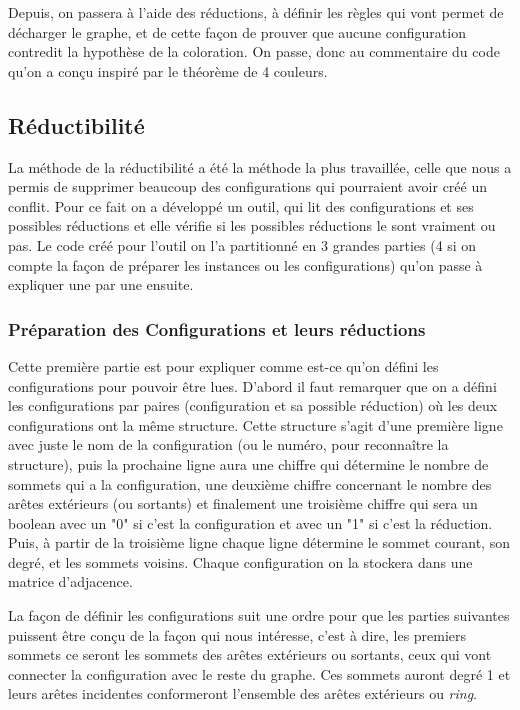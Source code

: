 \documentclass[10pt,a4paper]{article}
\begin{document}
Depuis, on passera à l'aide des réductions, à définir les règles qui vont permet de décharger le graphe, et de cette façon de prouver que aucune configuration contredit la hypothèse de la coloration. On passe, donc au commentaire du code qu'on a conçu inspiré par le théorème de 4 couleurs.


\subsection{Réductibilité}

La méthode de la réductibilité a été la méthode la plus travaillée, celle que nous a permis de supprimer beaucoup des configurations qui pourraient avoir créé un conflit. Pour ce fait on a développé un outil, qui lit des configurations et ses possibles réductions et elle vérifie si les possibles réductions le sont vraiment ou pas. Le code créé pour l'outil on l'a partitionné en 3 grandes parties (4 si on compte la façon de préparer les instances ou les configurations) qu'on passe à expliquer une par une ensuite.

\subsubsection{Préparation des Configurations et leurs réductions}

Cette première partie est pour expliquer comme est-ce qu'on défini les configurations pour pouvoir être lues. D'abord il  faut remarquer que on a défini les configurations par paires (configuration et sa possible réduction) où les deux configurations ont la même structure. Cette structure s'agit d'une première ligne avec juste le nom de la configuration (ou le numéro, pour reconnaître la structure), puis la prochaine ligne aura une chiffre qui détermine le nombre de sommets qui a la configuration, une deuxième chiffre concernant le nombre des arêtes extérieurs (ou sortants) et finalement une troisième chiffre qui sera un boolean avec un "0" si c'est la configuration et avec un "1" si c'est la réduction. Puis, à partir de la troisième ligne chaque ligne détermine le sommet courant, son degré, et les sommets voisins. Chaque configuration on la stockera dans une matrice d'adjacence.

La façon de définir les configurations suit une ordre pour que les parties suivantes puissent être conçu de la façon qui nous intéresse, c'est à dire, les premiers sommets ce seront les sommets des arêtes extérieurs ou sortants, ceux qui vont connecter la configuration avec le reste du graphe. Ces sommets auront degré 1 et leurs arêtes incidentes conformeront l'ensemble des arêtes extérieurs ou \emph{ring}.
\end{document}
